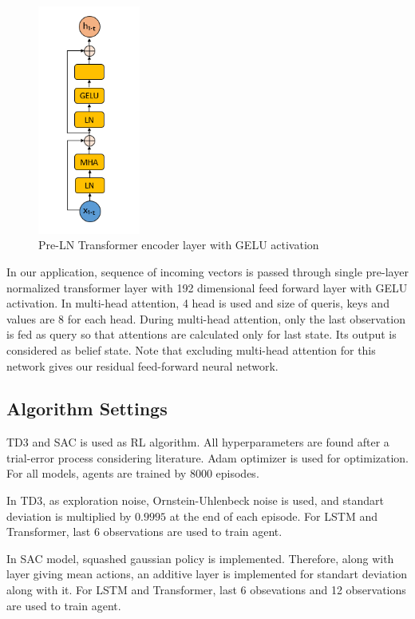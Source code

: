 \documentclass[a4paper, 12pt]{article} %
\begin{document}
\begin{figure}
	\centering
	\includegraphics[width=0.3\textwidth]{figures/ml_theory/transformer_block.png}
	\caption{Pre-LN Transformer encoder layer with GELU activation}
	\label{fig:pre_trsf}
\end{figure}

In our application, sequence of incoming vectors is passed through single pre-layer normalized transformer layer with 192 dimensional feed forward layer with GELU activation. 
In multi-head attention, 4 head is used and size of queris, keys and values are 8 for each head.
During multi-head attention, only the last observation is fed as query so that attentions are calculated only for last state.  
Its output is considered as belief state.
Note that excluding multi-head attention for this network gives our residual feed-forward neural network.

\subsection{Algorithm Settings}
TD3 and SAC is used as RL algorithm. 
All hyperparameters are found after a trial-error process considering literature. Adam optimizer is used for optimization. 
For all models, agents are trained by 8000 episodes.

In TD3, as exploration noise, Ornstein-Uhlenbeck noise is used, and standart deviation is multiplied  by $0.9995$ at the end of each episode. For LSTM and Transformer, last 6 observations are used to train agent. 

In SAC model, squashed gaussian policy is implemented. 
Therefore, along with layer giving mean actions, an additive layer is implemented for standart deviation along with it. 
For LSTM and Transformer, last 6 obsevations and 12 observations are used to train agent. 
\end{document}
